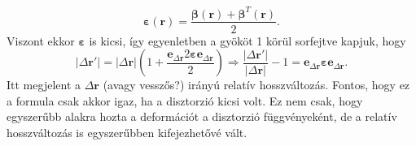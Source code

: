 \documentclass[12pt,a4paper]{scrartcl}
\let\mathbf\bm
\begin{document}
\begin{equation}
{\mathbf{\varepsilon }}\left( {\mathbf{r}} \right) = \frac{{{\mathbf{\beta }}\left( {\mathbf{r}} \right) + {{\mathbf{\beta }}^T}\left( {\mathbf{r}} \right)}}{2}.
\end{equation}
Viszont ekkor ${\mathbf{\varepsilon }}$ is kicsi, így \az{\eqref{eq:deform_def}} egyenletben a gyököt 1 körül sorfejtve kapjuk, hogy
\[\left| {\Delta {\mathbf{r}}'} \right| = \left| {\Delta {\mathbf{r}}} \right|\left( {1 + \frac{{{{\mathbf{e}}_{\Delta {\mathbf{r}}}}2{\mathbf{\varepsilon }}{{\mathbf{e}}_{\Delta {\mathbf{r}}}}}}{2}} \right) \Rightarrow \frac{{\left| {\Delta {\mathbf{r}}'} \right|}}{{\left| {\Delta {\mathbf{r}}} \right|}} - 1 = {{\mathbf{e}}_{\Delta {\mathbf{r}}}}{\mathbf{\varepsilon }}{{\mathbf{e}}_{\Delta {\mathbf{r}}}}.\]
Itt megjelent a ${\Delta {\mathbf{r}}}$ (avagy vesszős?) irányú relatív hosszváltozás. Fontos, hogy ez a formula csak akkor igaz, ha a disztorzió kicsi volt. Ez nem csak, hogy egyszerűbb alakra hozta a deformációt a disztorzió függvényeként, de a relatív hosszváltozás is egyszerűbben kifejezhetővé vált.
\end{document}
